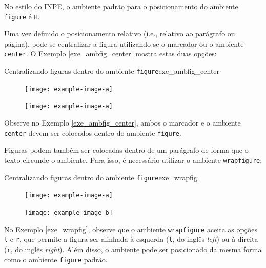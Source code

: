 \begin{marker}
  No estilo do INPE, o ambiente padrão para o posicionamento do ambiente {\tt figure} é {\tt H}.
\end{marker}

Uma vez definido o posicionamento relativo (i.e., relativo ao parágrafo ou página), pode-se centralizar a figura utilizando-se o marcador \texttt{\centering} ou o ambiente {\tt center}. O Exemplo \ref{exe_ambfig_center} mostra estas duas opções:

\begin{texexptitled}[breakable,enhanced,middle=2mm]{Centralizando figuras dentro do ambiente {\tt figure}}{exe_ambfig_center}
\lipsum[1]
\begin{figure}[H]
\centering
\texttt{[image: example-image-a]}
\end{figure}
\lipsum[2]
\begin{figure}[H]
    \begin{center}
        \texttt{[image: example-image-a]}
    \end{center}
\end{figure}
\end{texexptitled}

Observe no Exemplo \ref{exe_ambfig_center}, ambos o marcador \texttt{\centering} e o ambiente {\tt center} devem ser colocados dentro do ambiente {\tt figure}.

Figuras podem também ser colocadas dentro de um parágrafo de forma que o texto circunde o ambiente. Para isso, é necessário utilizar o ambiente {\tt wrapfigure}:

\begin{texexptitled}[enhanced,middle=2mm]{Centralizando figuras dentro do ambiente {\tt figure}}{exe_wrapfig}
\begin{figure}
    \centering
    \texttt{[image: example-image-a]}
\end{figure}
\lipsum[2]

\begin{figure}
    \centering
    \texttt{[image: example-image-b]}
\end{figure}
\lipsum[3]
\end{texexptitled}

No Exemplo \ref{exe_wrapfig}, observe que o ambiente {\tt wrapfigure} aceita as opções {\tt l} e {\tt r}, que permite a figura ser alinhada à esquerda ({\tt l}, do inglês \textit{left}) ou à direita ({\tt r}, do inglês \textit{right}). Além disso, o ambiente pode ser posicionado da mesma forma como o ambiente {\tt figure} padrão.

